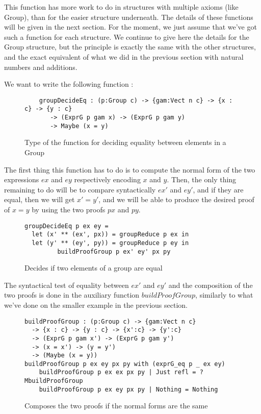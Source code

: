 This function has more work to do in structures with multiple axioms (like Group), than for the easier structure underneath.
The details of these functions will be given in the next section. For the moment, we just assume that we've got such a function for each structure. We continue to give here the details for the Group structure, but the principle is exactly the same with the other structures, and the exact equivalent of what we did in the previous section with natural numbers and additions.

We want to write the following function :

\begin{figure}[H]
\figrule
\begin{center}
\begin{verbatim}
	groupDecideEq : (p:Group c) -> {gam:Vect n c} -> {x : c} -> {y : c} 
	   -> (ExprG p gam x) -> (ExprG p gam y) 
	   -> Maybe (x = y)
\end{verbatim}
\end{center}
\caption{Type of the function for deciding equality between elements in a Group}
\figrule
\end{figure}

The first thing this function has to do is to compute the normal form of the two expressions $ex$ and $ey$ respectively encoding $x$ and $y$.
Then, the only thing remaining to do will be to compare syntactically $ex'$ and $ey'$, and if they are equal, then we will get $x'=y'$, and we will be able to produce the desired proof of $x=y$ by using the two proofs $px$ and $py$. 

\begin{figure}[H]
\figrule
\begin{center}
\begin{verbatim}
groupDecideEq p ex ey =
  let (x' ** (ex', px)) = groupReduce p ex in
  let (y' ** (ey', py)) = groupReduce p ey in
	     buildProofGroup p ex' ey' px py
\end{verbatim}
\end{center}
\caption{Decides if two elements of a group are equal}
\figrule
\end{figure}

The syntactical test of equality between $ex'$ and $ey'$ and the composition of the two proofs is done in the auxiliary function $buildProofGroup$, similarly to what we've done on the smaller example in the previous section. 

\begin{figure}[H]
\figrule
\begin{center}
\begin{verbatim}
buildProofGroup : (p:Group c) -> {gam:Vect n c} 
  -> {x : c} -> {y : c} -> {x':c} -> {y':c} 
  -> (ExprG p gam x') -> (ExprG p gam y') 
  -> (x = x') -> (y = y') 
  -> (Maybe (x = y))
buildProofGroup p ex ey px py with (exprG_eq p _ ex ey)
    buildProofGroup p ex ex px py | Just refl = ?MbuildProofGroup
    buildProofGroup p ex ey px py | Nothing = Nothing
\end{verbatim}
\end{center}
\caption{Composes the two proofs if the normal forms are the same}
\figrule
\end{figure}


